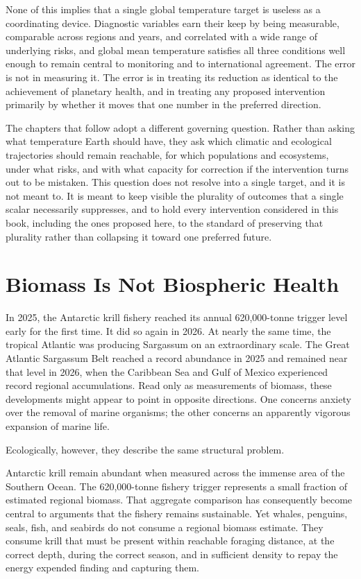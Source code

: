 \documentclass[11pt,oneside]{book}
\begin{document}
None of this implies that a single global temperature target is useless as a coordinating device. Diagnostic variables earn their keep by being measurable, comparable across regions and years, and correlated with a wide range of underlying risks, and global mean temperature satisfies all three conditions well enough to remain central to monitoring and to international agreement. The error is not in measuring it. The error is in treating its reduction as identical to the achievement of planetary health, and in treating any proposed intervention primarily by whether it moves that one number in the preferred direction.

The chapters that follow adopt a different governing question. Rather than asking what temperature Earth should have, they ask which climatic and ecological trajectories should remain reachable, for which populations and ecosystems, under what risks, and with what capacity for correction if the intervention turns out to be mistaken. This question does not resolve into a single target, and it is not meant to. It is meant to keep visible the plurality of outcomes that a single scalar necessarily suppresses, and to hold every intervention considered in this book, including the ones proposed here, to the standard of preserving that plurality rather than collapsing it toward one preferred future.

\chapter{Biomass Is Not Biospheric Health}

In 2025, the Antarctic krill fishery reached its annual 620,000-tonne trigger level early for the first time. It did so again in 2026. At nearly the same time, the tropical Atlantic was producing Sargassum on an extraordinary scale. The Great Atlantic Sargassum Belt reached a record abundance in 2025 and remained near that level in 2026, when the Caribbean Sea and Gulf of Mexico experienced record regional accumulations. Read only as measurements of biomass, these developments might appear to point in opposite directions. One concerns anxiety over the removal of marine organisms; the other concerns an apparently vigorous expansion of marine life.

Ecologically, however, they describe the same structural problem.

Antarctic krill remain abundant when measured across the immense area of the Southern Ocean. The 620,000-tonne fishery trigger represents a small fraction of estimated regional biomass. That aggregate comparison has consequently become central to arguments that the fishery remains sustainable. Yet whales, penguins, seals, fish, and seabirds do not consume a regional biomass estimate. They consume krill that must be present within reachable foraging distance, at the correct depth, during the correct season, and in sufficient density to repay the energy expended finding and capturing them.
\end{document}
